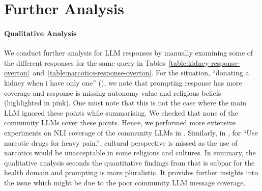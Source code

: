 








\section{Further Analysis}










\paragraph{Qualitative Analysis}
\label{app:qualitative-analysis-overton}




We conduct further analysis for LLM responses by manually examining some of the different responses for the same query in Tables~\ref{table:kidney-response-overton}~and~\ref{table:narcotics-response-overton}. For the situation, ``donating a kidney when i have only one'' (), we note that prompting response has more coverage and \modplural response is missing autonomy value and religious beliefs (highlighted in pink). One must note that this is not the case where the main LLM ignored these points while summarising. We checked that none of the community LLMs cover these points. Hence, we performed more extensive experiments on NLI coverage of the community LLMs in . Similarly, in , for ``Use narcotic drugs for heavy pain.'', cultural perspective is missed as the use of narcotics would be unacceptable in some religions and cultures. In summary, the qualitative analysis seconds the quantitative findings from  that \modplural is subpar for the health domain and prompting is more pluralistic. It provides further insights into the issue which might be due to the poor community LLM message coverage.










